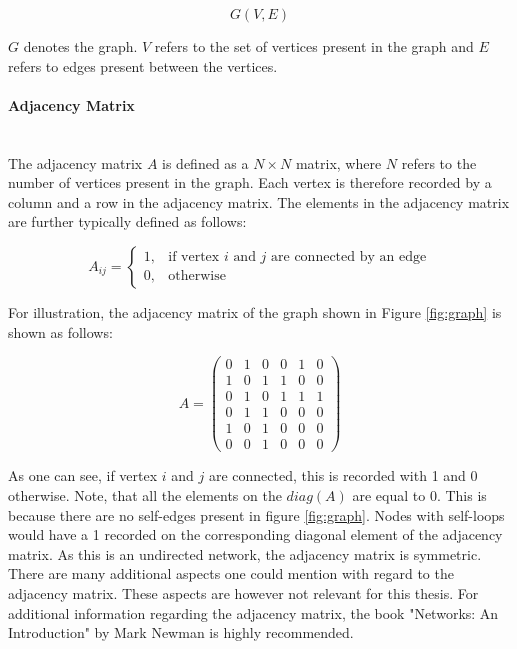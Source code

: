 	\begin{equation}
		G(V,E)
	\end{equation}

	\noindent $G$ denotes the graph. $V$ refers to the set of vertices present 
	in the graph and $E$ refers to edges present between the vertices.

	\paragraph{Adjacency Matrix} \mbox{}\\  

	\noindent The adjacency matrix $A$ is defined as a $N \times N$ matrix, 
	where $N$ refers to the number of vertices present in the graph. Each 
	vertex is therefore recorded by a column and a row in the adjacency matrix. 
	The elements in the adjacency matrix are further typically defined as follows:

	\begin{equation}
		A_{ij} = 
			\begin{cases}
				1, & \text{if vertex $i$ and $j$ are connected by an edge} \\
				0, & \text{otherwise}
			\end{cases}
	\end{equation}
	
	\noindent For illustration, the adjacency matrix of the graph shown in 
	Figure \ref{fig:graph} is shown as follows:

	\[ A = 
	\begin{pmatrix}
		0 & 1 & 0 & 0 & 1 & 0 \\
		1 & 0 & 1 & 1 & 0 & 0 \\
		0 & 1 & 0 & 1 & 1 & 1 \\
		0 & 1 & 1 & 0 & 0 & 0 \\
		1 & 0 & 1 & 0 & 0 & 0 \\
		0 & 0 & 1 & 0 & 0 & 0  
	\end{pmatrix}
	\] 
	
	\noindent As one can see, if vertex $i$ and $j$ are connected, this is 
	recorded with 1 and 0 otherwise. Note, that all the elements on the 
	$diag(A)$ are equal to 0. This is because there are no self-edges present 
	in figure \ref{fig:graph}. Nodes with self-loops would have a 1 recorded on 
	the corresponding diagonal element of the adjacency matrix. As this is an 
	undirected network, the adjacency matrix is symmetric. There are many 
	additional aspects one could mention with regard to the adjacency matrix. 
	These aspects are however not relevant for this thesis. For additional 
	information regarding the adjacency matrix, the book "Networks: An 
	Introduction" by Mark Newman \citeyearpar{Newman2010} is highly recommended. 

